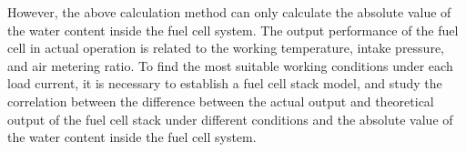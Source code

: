 However, the above calculation method can only calculate the absolute value of the water content inside the fuel cell system. The output performance of the fuel cell in actual operation is related to the working temperature, intake pressure, and air metering ratio. To find the most suitable working conditions under each load current, it is necessary to establish a fuel cell stack model, and study the correlation between the difference between the actual output and theoretical output of the fuel cell stack under different conditions and the absolute value of the water content inside the fuel cell system.
